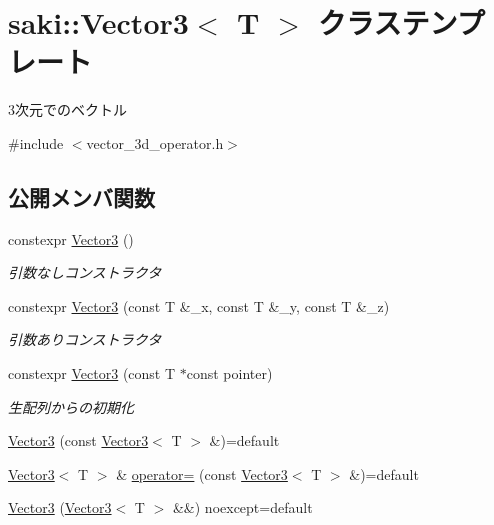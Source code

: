 \hypertarget{classsaki_1_1_vector3}{}\section{saki\+:\+:Vector3$<$ T $>$ クラステンプレート}
\label{classsaki_1_1_vector3}


3次元でのベクトル  




{\ttfamily \#include $<$vector\+\_\+3d\+\_\+operator.\+h$>$}

\subsection*{公開メンバ関数}
\begin{DoxyCompactItemize}
\item 
constexpr \mbox{\hyperlink{classsaki_1_1_vector3_a8617fe1a8d279c9673628728a0c5e5c6}{Vector3}} ()
\begin{DoxyCompactList}\small\item\em 引数なしコンストラクタ \end{DoxyCompactList}\item 
constexpr \mbox{\hyperlink{classsaki_1_1_vector3_abaf9038ebdc4895d7df1319b6234d790}{Vector3}} (const T \&\+\_\+x, const T \&\+\_\+y, const T \&\+\_\+z)
\begin{DoxyCompactList}\small\item\em 引数ありコンストラクタ \end{DoxyCompactList}\item 
constexpr \mbox{\hyperlink{classsaki_1_1_vector3_a486cbaea59124a022d52b4dcfc4bfdab}{Vector3}} (const T $\ast$const pointer)
\begin{DoxyCompactList}\small\item\em 生配列からの初期化 \end{DoxyCompactList}\item 
\mbox{\hyperlink{classsaki_1_1_vector3_ae996c120efb16029f71c26e24dfaa144}{Vector3}} (const \mbox{\hyperlink{classsaki_1_1_vector3}{Vector3}}$<$ T $>$ \&)=default
\item 
\mbox{\hyperlink{classsaki_1_1_vector3}{Vector3}}$<$ T $>$ \& \mbox{\hyperlink{classsaki_1_1_vector3_ac007820dba4edbbc1ee4cc030bc181a7}{operator=}} (const \mbox{\hyperlink{classsaki_1_1_vector3}{Vector3}}$<$ T $>$ \&)=default
\item 
\mbox{\hyperlink{classsaki_1_1_vector3_add1b3e26d1c54b75f1903c6303eb08a6}{Vector3}} (\mbox{\hyperlink{classsaki_1_1_vector3}{Vector3}}$<$ T $>$ \&\&) noexcept=default

\end{DoxyCompactItemize}
